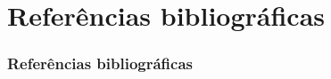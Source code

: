 \documentclass[aspectratio=169]{beamer}
\begin{document}
	\section{Refer\^{e}ncias bibliogr\'{a}ficas}
	\begin{frame}
		\frametitle{Refer\^{e}ncias bibliogr\'{a}ficas}
		
	\end{frame}
\end{document}
